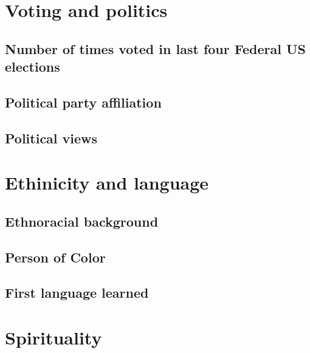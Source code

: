 \documentclass[
]{book}
\begin{document}
\hypertarget{voting-and-politics}{%
\section{Voting and politics}\label{voting-and-politics}}

\hypertarget{number-of-times-voted-in-last-four-federal-us-elections}{%
\subsection{Number of times voted in last four Federal US elections}\label{number-of-times-voted-in-last-four-federal-us-elections}}

\hypertarget{political-party-affiliation}{%
\subsection{Political party affiliation}\label{political-party-affiliation}}

\hypertarget{political-views}{%
\subsection{Political views}\label{political-views}}

\hypertarget{ethinicity-and-language}{%
\section{Ethinicity and language}\label{ethinicity-and-language}}

\hypertarget{ethnoracial-background}{%
\subsection{Ethnoracial background}\label{ethnoracial-background}}

\hypertarget{person-of-color}{%
\subsection{Person of Color}\label{person-of-color}}

\hypertarget{first-language-learned}{%
\subsection{First language learned}\label{first-language-learned}}

\hypertarget{spirituality}{%
\section{Spirituality}\label{spirituality}}
\end{document}
